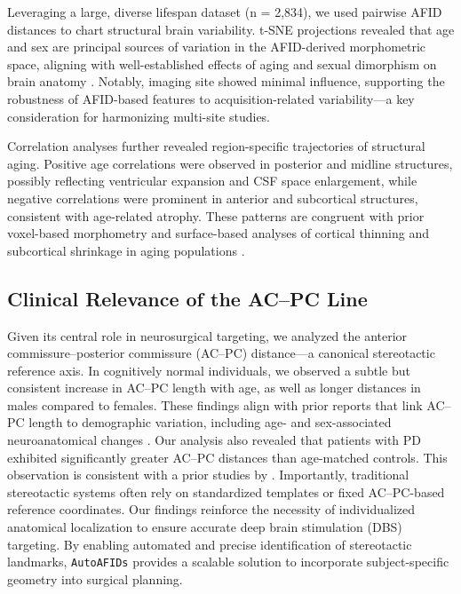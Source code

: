 Leveraging a large, diverse lifespan dataset (n = 2,834), we used pairwise AFID distances to chart structural brain variability. t-SNE projections revealed that age and sex are principal sources of variation in the AFID-derived morphometric space, aligning with well-established effects of aging and sexual dimorphism on brain anatomy \cite{Good2001-voxel, Ritchie2018-sex}. Notably, imaging site showed minimal influence, supporting the robustness of AFID-based features to acquisition-related variability—a key consideration for harmonizing multi-site studies.

Correlation analyses further revealed region-specific trajectories of structural aging. Positive age correlations were observed in posterior and midline structures, possibly reflecting ventricular expansion and CSF space enlargement, while negative correlations were prominent in anterior and subcortical structures, consistent with age-related atrophy. These patterns are congruent with prior voxel-based morphometry and surface-based analyses of cortical thinning and subcortical shrinkage in aging populations \cite{Fjell2009-brainage}.

\subsection{Clinical Relevance of the AC–PC Line}

Given its central role in neurosurgical targeting, we analyzed the anterior commissure–posterior commissure (AC–PC) distance—a canonical stereotactic reference axis. In cognitively normal individuals, we observed a subtle but consistent increase in AC–PC length with age, as well as longer distances in males compared to females. These findings align with prior reports that link AC–PC length to demographic variation, including age- and sex-associated neuroanatomical changes \cite{Lee2008-nd}. Our analysis also revealed that patients with PD exhibited significantly greater AC–PC distances than age-matched controls. This observation is consistent with a prior studies by \cite{Lee2008-nd,Dabadi2020-am}. Importantly, traditional stereotactic systems often rely on standardized templates or fixed AC–PC-based reference coordinates. Our findings reinforce the necessity of individualized anatomical localization to ensure accurate deep brain stimulation (DBS) targeting. By enabling automated and precise identification of stereotactic landmarks, \texttt{AutoAFIDs} provides a scalable solution to incorporate subject-specific geometry into surgical planning.

